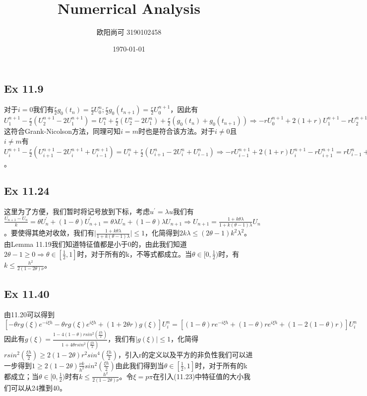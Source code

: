 \documentclass{article}
\title{Numerrical Analysis}
\author{欧阳尚可  3190102458}
\date{\today}
\begin{document}
\maketitle

\newpage
\subsection*{Ex 11.9}
\indent 对于$i=0$我们有$\frac{r}{2}g_0(t_n)=\frac{r}{2}U_0^n;\frac{r}{2}g_0(t_{n+1})=\frac{r}{2}U_0^{n+1}$，因此有$U^{n+1}_1-\frac{r}{2}(U_2^{n+1}-2U_{1}^{n+1})=U_1^n+\frac{r}{2}(U_2^n-2U^n_1)+\frac{r}{2}(g_0(t_n)+g_0(t_{n+1}))\Rightarrow -rU^{n+1}_0+2(1+r)U_1^{n+1}-rU^{n+1}_2=rU^n_0+2(1-r)U^n_1+rU^n_2$这符合Grank-Nicolson方法，同理可知$i=m$时也是符合该方法。对于$i\ne0$且$i\ne m$有$U_i^{n+1}-\frac{r}{2}(U_{i+1}^{n+1}-2U_i^{n+1}+U_{i-1}^{n+1})=U^n_i+\frac{r}{2}(U_{i+1}^n-2U_i^n+U_{i-1}^n)\Rightarrow -rU_{i-1}^{n+1}+2(1+r)U_i^{n+1}-rU_{i+1}^{n+1}=rU^n_{i-1}+2(1-r)U^n_i+rU_{i+1}^n$。

\subsection*{Ex 11.24}
\indent 这里为了方便，我们暂时将记号放到下标，考虑$u^{'}=\lambda u$我们有$\frac{U_{n+1}-U_{n}}{k}=\theta U^{'}_n+(1-\theta)U^{'}_{n+1}=\theta\lambda U_n+(1-\theta)\lambda U_{n+1}\Rightarrow U_{n+1}=\frac{1+k\theta\lambda}{1+k(\theta-1)\lambda}U_n$。要使得其绝对收敛，我们有$\vert \frac{1+k\theta\lambda}{1+k(\theta-1)\lambda}\vert\le1$，化简得到$2k\lambda\le(2\theta-1)k^2\lambda^2$。由Lemma 11.19我们知道特征值都是小于0的，由此我们知道$2\theta-1\ge0\Rightarrow \theta\in[\frac{1}{2},1]$时，对于所有的k，不等式都成立。当$\theta\in[0,\frac{1}{2})$时，有$k\le\frac{h^2}{2(1-2\theta)\nu}$。

\subsection*{Ex 11.40}
\indent 由11.20可以得到$[-\theta rg(\xi)e^{-i\xi h}-\theta rg(\xi)e^{i\xi h}+(1+2\theta r)g(\xi)]U_i^n=[(1-\theta)re^{-i\xi h}+(1-\theta)re^{i\xi h}+(1-2(1-\theta)r)]U_i^n$因此有$g(\xi)=\frac{1-4(1-\theta)rsin^2(\frac{\xi h}{2})}{1+4\theta rsin^2(\frac{\xi h}{2})}$，我们有$\vert g(\xi)\vert\le1$，化简得$rsin^2(\frac{\xi h}{2})\ge2(1-2\theta)r^2sin^4(\frac{\xi h}{2})$，引入r的定义以及平方的非负性我们可以进一步得到$1\ge2(1-2\theta)\frac{\nu k}{h^2}sin^2(\frac{\xi h}{2})$由此我们得到当$\theta\in[\frac{1}{2},1]$时，对于所有的k都成立；当$\theta\in[0,\frac{1}{2})$时有$k\le\frac{h^2}{2(1-2\theta)\nu}$。令$\xi = p\pi$在引入(11.23)中特征值的大小我们可以从24推到40。
\end{document}
